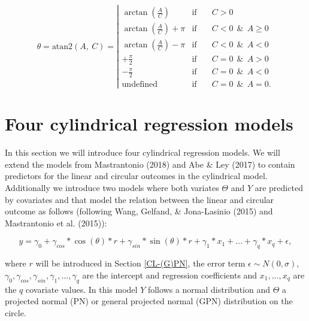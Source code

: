 \documentclass[11pt,]{article}
\begin{document}
\begin{equation}\label{PredVal}
\theta          = \text{atan2}\left(A, \: C\right)  =
\left|{\begin{array}{lcl}
                                                                       \arctan\left(\frac{A}{C}\right) & \text{if}  \quad&C > 0 \\
\arctan\left(\frac{A}{C}\right) + \pi & \text{if}  \quad& C  <  0  \:\: \&\:\: A \geq 0\\
 \arctan\left(\frac{A}{C}\right) - \pi & \text{if}  \quad&C  <  0 \:\:  \&\:\:A  < 0\\
 +\frac{\pi}{2} & \text{if}  \quad& C  =  0  \:\: \&\:\:A > 0\\
 -\frac{\pi}{2} & \text{if}  \quad& C =  0  \:\: \&\:\:A < 0\\
 \text{undefined} & \text{if} \quad& C =  0   \:\: \&\:\:A = 0.
 \end{array}}
\right.
\end{equation}

\section{Four cylindrical regression models}\label{Models}

In this section we will introduce four cylindrical regression models. We
will extend the models from Mastrantonio (2018) and Abe \& Ley (2017) to
contain predictors for the linear and circular outcomes in the
cylindrical model. Additionally we introduce two models where both
variates \(\Theta\) and \(Y\) are predicted by covariates and that model
the relation between the linear and circular outcome as follows
(following Wang, Gelfand, \& Jona-Lasinio (2015) and Mastrantonio et al.
(2015)):

\begin{equation}\label{circlinlink}
y = \gamma_0 + \gamma_{cos}*\cos(\theta)*r + \gamma_{sin}*\sin(\theta)*r + \gamma_1*x_1 + \dots + \gamma_q*x_q +  \epsilon,
\end{equation}

where \(r\) will be introduced in Section \ref{CL-(G)PN}, the error term
\(\epsilon \sim N(0, \sigma)\),
\(\gamma_0, \gamma_{cos}, \gamma_{sin}, \gamma_1, \dots, \gamma_q\) are
the intercept and regression coefficients and \(x_1, \dots, x_q\) are
the \(q\) covariate values. In this model \(Y\) follows a normal
distribution and \(\Theta\) a projected normal (PN) or general projected
normal (GPN) distribution on the circle.
\end{document}
